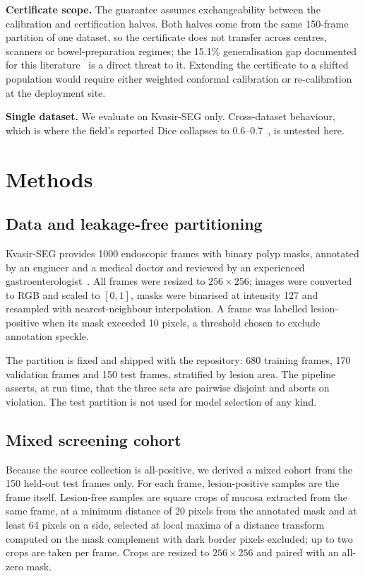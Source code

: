 \documentclass[journal]{IEEEtran}
\begin{document}
\textbf{Certificate scope.} The guarantee assumes exchangeability between the calibration and certification halves. Both halves come from the same 150-frame partition of one dataset, so the certificate does not transfer across centres, scanners or bowel-preparation regimes; the 15.1\% generalisation gap documented for this literature~\cite{divya2026review} is a direct threat to it. Extending the certificate to a shifted population would require either weighted conformal calibration or re-calibration at the deployment site.

\textbf{Single dataset.} We evaluate on Kvasir-SEG only. Cross-dataset behaviour, which is where the field's reported Dice collapses to 0.6--0.7~\cite{xiao2026prysmnet}, is untested here.

\section{Methods}

\subsection{Data and leakage-free partitioning}

Kvasir-SEG provides 1000 endoscopic frames with binary polyp masks, annotated by an engineer and a medical doctor and reviewed by an experienced gastroenterologist~\cite{jha2020kvasir}. All frames were resized to $256\times256$; images were converted to RGB and scaled to $[0,1]$, masks were binarised at intensity 127 and resampled with nearest-neighbour interpolation. A frame was labelled lesion-positive when its mask exceeded 10 pixels, a threshold chosen to exclude annotation speckle.

The partition is fixed and shipped with the repository: 680 training frames, 170 validation frames and 150 test frames, stratified by lesion area. The pipeline asserts, at run time, that the three sets are pairwise disjoint and aborts on violation. The test partition is not used for model selection of any kind.

\subsection{Mixed screening cohort}

Because the source collection is all-positive, we derived a mixed cohort from the 150 held-out test frames only. For each frame, lesion-positive samples are the frame itself. Lesion-free samples are square crops of mucosa extracted from the same frame, at a minimum distance of 20 pixels from the annotated mask and at least 64 pixels on a side, selected at local maxima of a distance transform computed on the mask complement with dark border pixels excluded; up to two crops are taken per frame. Crops are resized to $256\times256$ and paired with an all-zero mask.
\end{document}
